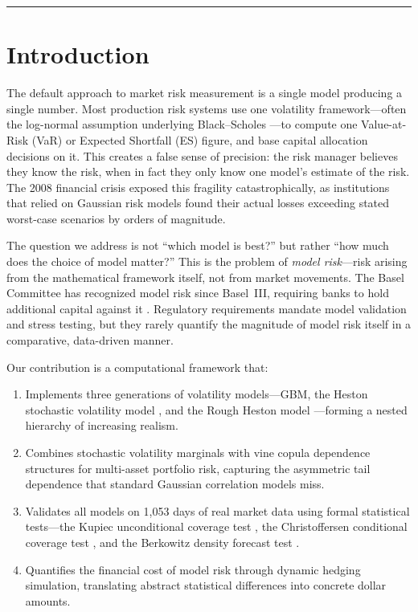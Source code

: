 \documentclass[11pt,a4paper]{article}
\begin{document}
\vspace{0.3em}
\hrule
\vspace{1em}

\section{Introduction}
\label{sec:intro}

The default approach to market risk measurement is a single model producing a single number.
Most production risk systems use one volatility framework---often the log-normal assumption underlying Black--Scholes \citep{black1973}---to compute one Value-at-Risk (VaR) or Expected Shortfall (ES) figure, and base capital allocation decisions on it.
This creates a false sense of precision: the risk manager believes they know the risk, when in fact they only know one model's estimate of the risk.
The 2008 financial crisis exposed this fragility catastrophically, as institutions that relied on Gaussian risk models found their actual losses exceeding stated worst-case scenarios by orders of magnitude.

The question we address is not ``which model is best?'' but rather ``how much does the choice of model matter?''
This is the problem of \emph{model risk}---risk arising from the mathematical framework itself, not from market movements.
The Basel Committee has recognized model risk since Basel~III, requiring banks to hold additional capital against it \citep{basel2016, mcneil2015}.
Regulatory requirements mandate model validation and stress testing, but they rarely quantify the magnitude of model risk itself in a comparative, data-driven manner.

Our contribution is a computational framework that:
\begin{enumerate}[leftmargin=1.5em]
    \item Implements three generations of volatility models---GBM, the Heston stochastic volatility model \citep{heston1993}, and the Rough Heston model \citep{gatheral2018}---forming a nested hierarchy of increasing realism.
    \item Combines stochastic volatility marginals with vine copula dependence structures \citep{aas2009} for multi-asset portfolio risk, capturing the asymmetric tail dependence that standard Gaussian correlation models miss.
    \item Validates all models on 1{,}053 days of real market data using formal statistical tests---the Kupiec unconditional coverage test \citep{kupiec1995}, the Christoffersen conditional coverage test \citep{christoffersen1998}, and the Berkowitz density forecast test \citep{berkowitz2002}.
    \item Quantifies the financial cost of model risk through dynamic hedging simulation, translating abstract statistical differences into concrete dollar amounts.
\end{enumerate}
\end{document}
